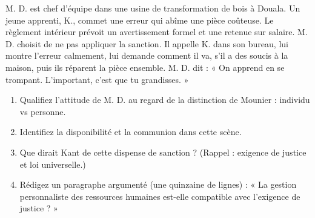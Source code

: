 \documentclass[11pt]{article}
\newcommand{\cle}[1]{{\popxbold\color{popdark}#1}}
\begin{document}
\begin{exercice}
M. D. est chef d'équipe dans une usine de transformation de bois à Douala. Un jeune apprenti, K., commet une erreur qui abîme une pièce coûteuse. Le règlement intérieur prévoit un avertissement formel et une retenue sur salaire. M. D. choisit de ne pas appliquer la sanction. Il appelle K. dans son bureau, lui montre l'erreur calmement, lui demande comment il va, s'il a des soucis à la maison, puis ils réparent la pièce ensemble. M. D. dit : « On apprend en se trompant. L'important, c'est que tu grandisses. »
\begin{enumerate}
    \item Qualifiez l'attitude de M. D. au regard de la distinction de Mounier : \cle{individu} vs \cle{personne}.
    \item Identifiez la \cle{disponibilité} et la \cle{communion} dans cette scène.
    \item Que dirait Kant de cette dispense de sanction ? (Rappel : exigence de justice et loi universelle.)
    \item Rédigez un paragraphe argumenté (une quinzaine de lignes) : « La gestion personnaliste des ressources humaines est-elle compatible avec l'exigence de justice ? »
\end{enumerate}
\end{exercice}
\end{document}
